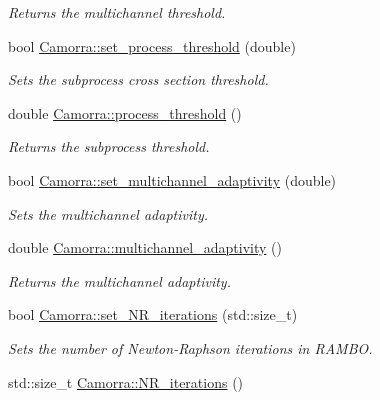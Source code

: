 \begin{DoxyCompactItemize}
\begin{DoxyCompactList}\small\item\em Returns the multichannel threshold. \end{DoxyCompactList}\item 
\hypertarget{a00831_ad948e666ecd83f1c578d34a579cc5312}{
bool \hyperlink{a00831_ad948e666ecd83f1c578d34a579cc5312}{Camorra::set\_\-process\_\-threshold} (double)}
\label{a00831_ad948e666ecd83f1c578d34a579cc5312}

\begin{DoxyCompactList}\small\item\em Sets the subprocess cross section threshold. \end{DoxyCompactList}\item 
double \hyperlink{a00831_aed082a9b724d627f7563c76fa9c58824}{Camorra::process\_\-threshold} ()
\begin{DoxyCompactList}\small\item\em Returns the subprocess threshold. \end{DoxyCompactList}\item 
\hypertarget{a00831_a7c523c66223d4c95a3643a4edfde68ef}{
bool \hyperlink{a00831_a7c523c66223d4c95a3643a4edfde68ef}{Camorra::set\_\-multichannel\_\-adaptivity} (double)}
\label{a00831_a7c523c66223d4c95a3643a4edfde68ef}

\begin{DoxyCompactList}\small\item\em Sets the multichannel adaptivity. \end{DoxyCompactList}\item 
\hypertarget{a00831_a8a3cd9f4acc73ceff9a10603cf104557}{
double \hyperlink{a00831_a8a3cd9f4acc73ceff9a10603cf104557}{Camorra::multichannel\_\-adaptivity} ()}
\label{a00831_a8a3cd9f4acc73ceff9a10603cf104557}

\begin{DoxyCompactList}\small\item\em Returns the multichannel adaptivity. \end{DoxyCompactList}\item 
bool \hyperlink{a00831_a3710f88bf2e06b4efacb54c3b6617e97}{Camorra::set\_\-NR\_\-iterations} (std::size\_\-t)
\begin{DoxyCompactList}\small\item\em Sets the number of Newton-\/Raphson iterations in RAMBO. \end{DoxyCompactList}\item 
\hypertarget{a00831_a26ad4e0b5a59c164e61f5abfec49b85f}{
std::size\_\-t \hyperlink{a00831_a26ad4e0b5a59c164e61f5abfec49b85f}{Camorra::NR\_\-iterations} ()}
\label{a00831_a26ad4e0b5a59c164e61f5abfec49b85f}


\end{DoxyCompactItemize}
